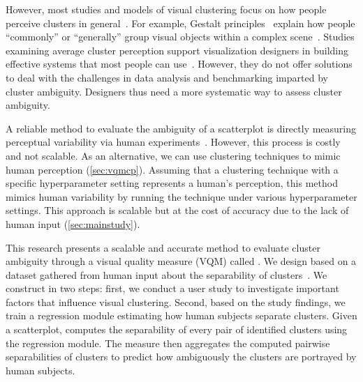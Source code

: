 However, most studies and models of visual clustering focus on how people perceive clusters in general~\cite{abbas19cgf, xia21cgna, wertheimer22pf}. For example, Gestalt principles~\cite{wertheimer22pf} explain how people ``commonly'' or ``generally'' group visual objects within a complex scene~\cite{pinna2010new}. 
Studies examining average cluster perception support visualization designers in building effective systems 
that most people can use~\cite{lu20tvcg, wang19tvcg, nonato19tvcg}. However, they do not offer solutions to deal with the challenges in data analysis and benchmarking imparted by cluster ambiguity. Designers thus need a more systematic way to assess cluster ambiguity.


A reliable method to evaluate the ambiguity of a scatterplot is directly measuring perceptual variability via human experiments~\cite{hartwig2023clusternet}.
However, this process is costly and not scalable.
As an alternative, we can use clustering techniques to mimic human perception \cite{aupetit2016sepme, sedlmair2015data} (\autoref{sec:vqmcp}). 
Assuming that a clustering technique with a specific hyperparameter setting represents a human’s perception, this method mimics human variability by running the technique under various hyperparameter settings.
 This approach is scalable but at the cost of 
accuracy due to the lack of 
human input (\autoref{sec:mainstudy}).




This research presents a scalable and accurate method to evaluate cluster ambiguity through a visual quality measure (VQM) called \textit{\measure}. 
We design \measure based on a dataset gathered from human input about the separability of clusters~\cite{abbas19cgf}. 
We construct \measure in two steps: first, we conduct a user study to investigate important factors that influence visual clustering. 
Second, based on the study findings, we train a regression module estimating how human subjects separate clusters.
Given a scatterplot, \measure computes the separability of every pair of identified clusters using the regression module. 
The measure then aggregates the computed pairwise separabilities of clusters to predict how ambiguously the clusters are portrayed by human subjects. 

